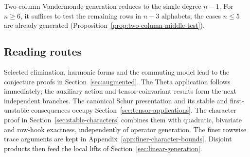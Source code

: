Two-column Vandermonde generation reduces to the single degree
$n-1$. For $n\ge6$, it suffices to test the remaining rows in
$n-3$ alphabets; the cases $n\le5$ are already generated
(Proposition~\ref{prop:two-column-middle-test}).

\subsection{Reading routes}
Selected elimination, harmonic forms and the commuting model lead to the
conjecture proofs in Section~\ref{sec:augmented}. The Theta application
follows immediately; the auxiliary action and tensor-coinvariant results
form the next independent branches.
The canonical Schur presentation and its stable and first-unstable
consequences occupy Section~\ref{sec:tensor-applications}. The character
proof in Section~\ref{sec:stable-characters} combines them with quadratic,
bivariate and row-hook exactness, independently of operator generation.
The finer rowwise trace arguments are kept in
Appendix~\ref{app:finer-character-bounds}. Disjoint products then feed the local lifts
of Section~\ref{sec:linear-generation}.
